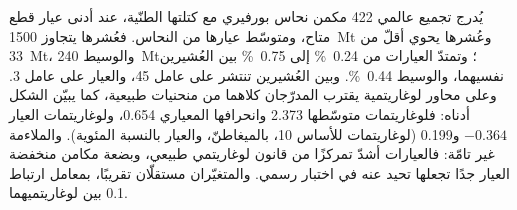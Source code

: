 يُدرج تجميع عالمي 422 مكمن نحاس بورفيري مع كتلتها الطنّية، عند أدنى عيار
قطع متاح، ومتوسّط عيارها من النحاس. فعُشرها يتجاوز \qty{1500}{Mt} وعُشرها يحوي أقلّ
من \qty{33}{Mt}، والوسيط \qty{240}{Mt}؛ وتمتدّ العيارات من \qty{0.24}{\percent} إلى
\qty{0.75}{\percent} بين العُشيرين نفسيهما، والوسيط \qty{0.44}{\percent}. وبين
العُشيرين تنتشر  على عامل 45، والعيار على عامل 3. وعلى محاور لوغاريتمية يقترب المدرّجان كلاهما من منحنيات طبيعية، كما يبيّن الشكل أدناه:
فلوغاريتمات  متوسّطها 2.373 وانحرافها المعياري 0.654، ولوغاريتمات العيار
$-0.364$ و0.199 (لوغاريتمات للأساس 10،  بالميغاطنّ، والعيار بالنسبة المئوية). والملاءمة
غير تامّة: فالعيارات أشدّ تمركزًا من قانون لوغاريتمي طبيعي، وبضعة مكامن منخفضة العيار جدًا تجعلها
تحيد عنه في اختبار رسمي. والمتغيّران مستقلّان تقريبًا، بمعامل ارتباط
0.1 بين لوغاريتميهما.

